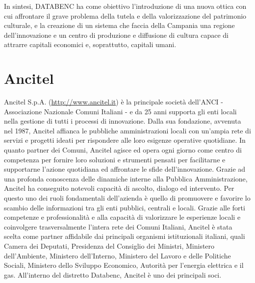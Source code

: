 In sintesi, DATABENC ha come obiettivo l'introduzione di una nuova ottica con cui affrontare il grave problema della tutela e della valorizzazione del patrimonio culturale, e la creazione di un sistema che faccia della Campania una regione dell'innovazione e un centro di produzione e diffusione di cultura capace di attrarre capitali economici e, soprattutto, capitali umani.


\section{Ancitel}

Ancitel S.p.A. (\url{http://www.ancitel.it}) è la principale società dell'ANCI - Associazione Nazionale Comuni Italiani - e da 25 anni supporta gli enti locali nella gestione di tutti i processi di innovazione.
Dalla sua fondazione, avvenuta nel 1987,  Ancitel affianca le pubbliche amministrazioni locali con un'ampia rete di servizi e progetti ideati per rispondere alle loro esigenze operative quotidiane.
In quanto partner dei Comuni, Ancitel agisce ed opera ogni giorno come centro di competenza per fornire loro soluzioni e strumenti pensati per facilitarne e supportarne l'azione quotidiana ed affrontare le sfide dell'innovazione. 
Grazie ad una profonda conoscenza delle dinamiche interne alla Pubblica Amministrazione, Ancitel ha conseguito notevoli capacità di ascolto, dialogo ed intervento. Per questo uno dei ruoli fondamentali dell'azienda è quello di promuovere e favorire lo scambio delle informazioni tra gli enti pubblici, centrali e locali.
Grazie alle forti competenze e professionalità e alla capacità di valorizzare le esperienze locali e coinvolgere trasversalmente l'intera rete dei Comuni Italiani, Ancitel è stata scelta come partner affidabile dai principali organismi istituzionali italiani, quali Camera dei Deputati, Presidenza del Consiglio dei Ministri, Ministero dell'Ambiente, Ministero dell'Interno, Ministero del Lavoro e delle Politiche Sociali, Ministero dello Sviluppo Economico, Autorità per l'energia elettrica e il gas.
All'interno del distretto Databenc, Ancitel è uno dei principali soci. 



